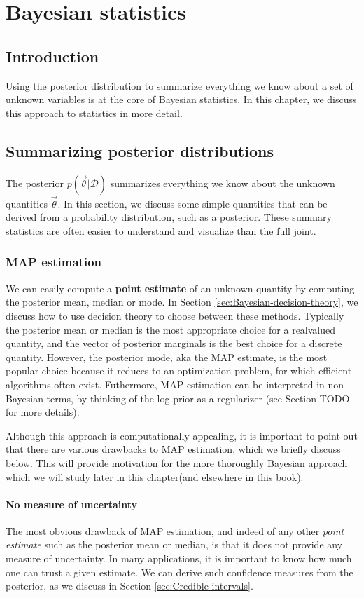 \chapter{Bayesian statistics}
\label{chap:Bayesian statistics}

\section{Introduction}
Using the posterior distribution to summarize everything we know about a set of unknown variables is at the core of Bayesian statistics. In this chapter, we discuss this approach to statistics in more detail.


\section{Summarizing posterior distributions}
The posterior $p(\vec{\theta}|\mathcal{D})$ summarizes everything we know about the unknown quantities $\vec{\theta}$. In this section, we discuss some simple quantities that can be derived from a probability distribution, such as a posterior. These summary statistics are often easier to understand and visualize than the full joint.


\subsection{MAP estimation}
We can easily compute a \textbf{point estimate} of an unknown quantity by computing the posterior mean, median or mode. In Section \ref{sec:Bayesian-decision-theory}, we discuss how to use decision theory to choose between these methods. Typically the posterior mean or median is the most appropriate choice for a realvalued quantity, and the vector of posterior marginals is the best choice for a discrete quantity. However, the posterior mode, aka the MAP estimate, is the most popular choice because it reduces to an optimization problem, for which efficient algorithms often exist. Futhermore, MAP estimation can be interpreted in non-Bayesian terms, by thinking of the log prior as a regularizer (see Section TODO for more details).

Although this approach is computationally appealing, it is important to point out that there are various drawbacks to MAP estimation, which we briefly discuss below. This will provide motivation for the more thoroughly Bayesian approach which we will study later in this chapter(and elsewhere in this book).


\subsubsection{No measure of uncertainty}
The most obvious drawback of MAP estimation, and indeed of any other \emph{point estimate} such as the posterior mean or median, is that it does not provide any measure of uncertainty. In many applications, it is important to know how much one can trust a given estimate. We can derive such confidence measures from the posterior, as we discuss in Section \ref{sec:Credible-intervals}.

